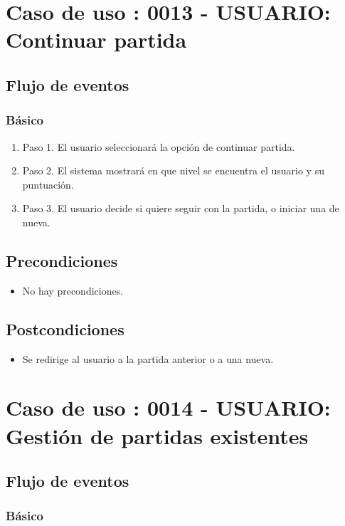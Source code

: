 \section{Caso de uso : 0013 - USUARIO: Continuar partida}\label{sec:uc0}
\subsection{Flujo de eventos}
\subsubsection{Básico}

\begin{enumerate}
\item Paso 1.
El usuario seleccionará la opción de continuar partida.
\item Paso 2.
El sistema mostrará en que nivel se encuentra el usuario y su puntuación.
\item Paso 3.
El usuario decide si quiere seguir con la partida, o iniciar una de nueva.
\end{enumerate}

\subsection{Precondiciones}
\begin{itemize}
\item No hay precondiciones.
\end{itemize}

\subsection{Postcondiciones}
\begin{itemize}
\item Se redirige al usuario a la partida anterior o a una nueva.
\end{itemize}



\section{Caso de uso : 0014 - USUARIO: Gestión de partidas existentes}\label{sec:uc0}
\subsection{Flujo de eventos}
\subsubsection{Básico}

